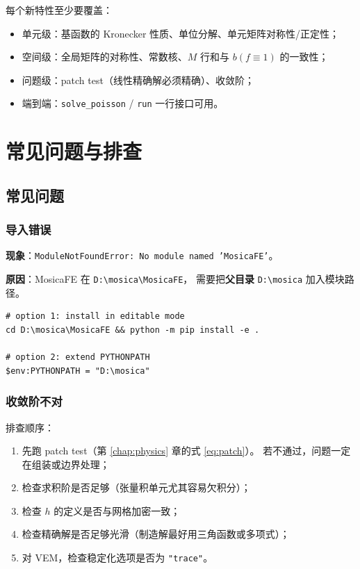 \documentclass[UTF8,11pt,oneside]{ctexbook}
\theoremstyle{definition}
\theoremstyle{plain}
\newcommand{\mosica}{\textsf{MosicaFE}}
\newcommand{\code}[1]{\texttt{#1}}
\begin{document}
每个新特性至少要覆盖：

\begin{itemize}[itemsep=0.2em]
  \item 单元级：基函数的 Kronecker 性质、单位分解、单元矩阵对称性/正定性；
  \item 空间级：全局矩阵的对称性、常数核、$M$ 行和与 $b(f\equiv1)$ 的一致性；
  \item 问题级：patch test（线性精确解必须精确）、收敛阶；
  \item 端到端：\code{solve\_\allowbreak poisson} / \code{run} 一行接口可用。
\end{itemize}

\chapter{常见问题与排查}
\label{chap:faq}

\section{常见问题}

\subsection{导入错误}

\textbf{现象}：\code{ModuleNotFoundError: No module named 'MosicaFE'}。

\textbf{原因}：\mosica{} 在 \code{D:\textbackslash mosica\textbackslash MosicaFE}，
需要把\textbf{父目录} \code{D:\textbackslash mosica} 加入模块路径。

\begin{lstlisting}[style=shell]
# option 1: install in editable mode
cd D:\mosica\MosicaFE && python -m pip install -e .

# option 2: extend PYTHONPATH
$env:PYTHONPATH = "D:\mosica"
\end{lstlisting}

\subsection{收敛阶不对}

排查顺序：

\begin{enumerate}[label=(\arabic*),itemsep=0.15em]
  \item 先跑 patch test（第 \ref{chap:physics} 章的式 \eqref{eq:patch}）。
        若不通过，问题一定在组装或边界处理；
  \item 检查求积阶是否足够（张量积单元尤其容易欠积分）；
  \item 检查 \(h\) 的定义是否与网格加密一致；
  \item 检查精确解是否足够光滑（制造解最好用三角函数或多项式）；
  \item 对 VEM，检查稳定化选项是否为 \code{"trace"}。
\end{enumerate}
\end{document}
